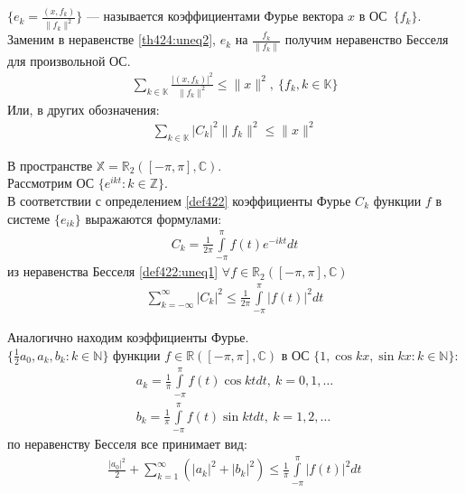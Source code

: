 \begin{definition}
  \label{def422}
  $\{e_k = \frac{(x, f_k)}{\|f_k\|^2} \}$ --- называется коэффициентами Фурье
  вектора $x$ в ОС~$\{f_k\}$. \\
  Заменим в неравенстве \eqref{th424:uneq2}, $e_k$ на $\frac{f_k}{\|f_k\|}$
  получим неравенство Бесселя для произвольной ОС.
  \begin{gather}
    \sum\limits_{k \in \mathbb{K}} \frac{|(x, f_k)|^2}{\|f_k\|^2} \leq \|x\|^2,
    \ \{f_k, k \in \mathbb{K}\}
    \label{def422:uneq1}
  \end{gather}
  Или, в других обозначения:
  \begin{gather*}
    \sum\limits_{k \in \mathbb{K}} |C_k|^2 \|f_k\|^2 \leq \|x\|^2
  \end{gather*}
\end{definition}

\begin{example}
  В пространстве $\mathbb{X} = \mathbb{R}_2([-\pi, \pi], \mathbb{C})$. \\
  Рассмотрим ОС $\{e^{ikt}: k \in \mathbb{Z}\}$. \\
  В соответствии с определением \eqref{def422} коэффициенты Фурье $C_k$ функции
  $f$ в системе $\{e_{ik}\}$ выражаются формулами:
  \begin{gather}
    C_k = \frac{1}{2\pi} \int\limits_{-\pi}^\pi f(t) e^{-ikt} dt
    \label{ex421:coef1}
  \end{gather}
  из неравенства Бесселя \eqref{def422:uneq1} $\forall f \in
  \mathbb{R}_2([-\pi,\pi], \mathbb{C})$
  \begin{gather}
    \sum\limits_{k = -\infty}^{\infty} |C_k|^2 \leq \frac{1}{2\pi}
    \int\limits_{-\pi}^\pi |f(t)|^2 dt
    \label{ex421:uneq1}
  \end{gather}
\end{example}

\begin{example}
  Аналогично находим коэффициенты Фурье. \\
  $\{\frac{1}{2} a_0, a_k, b_k : k \in \mathbb{N}\}$ функции $f \in
  \mathbb{R}([-\pi, \pi], \mathbb{C})$ в ОС $\{1, \cos kx, \sin kx : k \in
  \mathbb{N}\}$:
  \begin{gather}
    a_k = \frac{1}{\pi} \int\limits_{-\pi}^\pi f(t) \cos kt dt, \ k = 0, 1,
    \dots \label{ex422:coef1} \\
    b_k = \frac{1}{\pi} \int\limits_{-\pi}^\pi f(t) \sin kt dt, \ k = 1, 2,
    \dots \label{ex422:coef2}
  \end{gather}
  по неравенству Бесселя все принимает вид:
  \begin{gather}
    \frac{|a_0|^2}{2} + \sum\limits_{k = 1}^{\infty} (|a_k|^2 + |b_k|^2) \leq
    \frac{1}{\pi} \int\limits_{-\pi}^\pi |f(t)|^2 dt \label{ex422:uneq1}
  \end{gather}
\end{example}

